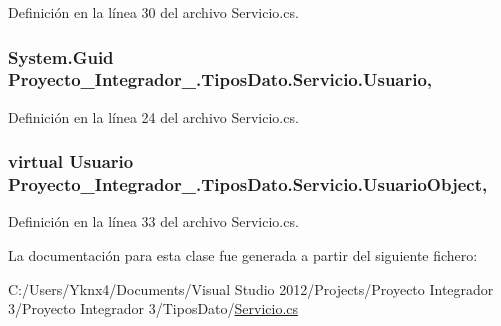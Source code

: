 Definición en la línea 30 del archivo Servicio.\-cs.

\hypertarget{class_proyecto___integrador__3_1_1_tipos_dato_1_1_servicio_a9321964b41ee188556767aabeecfc737}{
\subsubsection[{Usuario}]{\setlength{\rightskip}{0pt plus 5cm}System.\-Guid Proyecto\-\_\-\-Integrador\-\_.\-Tipos\-Dato.\-Servicio.\-Usuario\hspace{0.3cm}{\ttfamily [get]}, {\ttfamily [set]}}}\label{class_proyecto___integrador__3_1_1_tipos_dato_1_1_servicio_a9321964b41ee188556767aabeecfc737}


Definición en la línea 24 del archivo Servicio.\-cs.

\hypertarget{class_proyecto___integrador__3_1_1_tipos_dato_1_1_servicio_addfdec1cd1f2629003b19752e0e0020b}{
\subsubsection[{Usuario\-Object}]{\setlength{\rightskip}{0pt plus 5cm}virtual {\bf Usuario} Proyecto\-\_\-\-Integrador\-\_.\-Tipos\-Dato.\-Servicio.\-Usuario\-Object\hspace{0.3cm}{\ttfamily [get]}, {\ttfamily [set]}}}\label{class_proyecto___integrador__3_1_1_tipos_dato_1_1_servicio_addfdec1cd1f2629003b19752e0e0020b}


Definición en la línea 33 del archivo Servicio.\-cs.



La documentación para esta clase fue generada a partir del siguiente fichero\-:\begin{DoxyCompactItemize}
\item 
C\-:/\-Users/\-Yknx4/\-Documents/\-Visual Studio 2012/\-Projects/\-Proyecto Integrador 3/\-Proyecto Integrador 3/\-Tipos\-Dato/\hyperlink{_servicio_8cs}{Servicio.\-cs}\end{DoxyCompactItemize}
